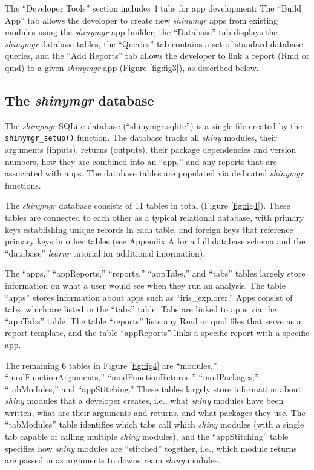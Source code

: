 The ``Developer Tools'' section includes 4 tabs for app development: The ``Build App'' tab allows the developer to create new \emph{shinymgr} apps from existing modules using the \emph{shinymgr} app builder; the ``Database'' tab displays the \emph{shinymgr} database tables, the ``Queries'' tab contains a set of standard database queries, and the ``Add Reports'' tab allows the developer to link a report (Rmd or qmd) to a given \emph{shinymgr} app (Figure \ref{fig:fig3}), as described below.

\subsection{\texorpdfstring{The \emph{shinymgr} database}{The shinymgr database}}\label{the-shinymgr-database}

The \emph{shinymgr} SQLite database (``shinymgr.sqlite'') is a single file created by the \texttt{shinymgr\_setup()} function. The database tracks all \emph{shiny} modules, their arguments (inputs), returns (outputs), their package dependencies and version numbers, how they are combined into an ``app,'' and any reports that are associated with apps. The database tables are populated via dedicated \emph{shinymgr} functions.

The \emph{shinymgr} database consists of 11 tables in total (Figure \ref{fig:fig4}). These tables are connected to each other as a typical relational database, with primary keys establishing unique records in each table, and foreign keys that reference primary keys in other tables (see Appendix A for a full database schema and the ``database'' \emph{learnr} tutorial for additional information).

The ``apps,'' ``appReports,'' ``reports,'' ``appTabs,'' and ``tabs'' tables largely store information on what a user would see when they run an analysis. The table ``apps'' stores information about apps such as ``iris\_explorer.'' Apps consist of tabs, which are listed in the ``tabs'' table. Tabs are linked to apps via the ``appTabs'' table. The table ``reports'' lists any Rmd or qmd files that serve as a report template, and the table ``appReports'' links a specific report with a specific app.

The remaining 6 tables in Figure \ref{fig:fig4} are ``modules,'' ``modFunctionArguments,'' ``modFunctionReturns,'' ``modPackages,'' ``tabModules,'' and ``appStitching.'' These tables largely store information about \emph{shiny} modules that a developer creates, i.e., what \emph{shiny} modules have been written, what are their arguments and returns, and what packages they use. The ``tabModules'' table identifies which tabs call which \emph{shiny} modules (with a single tab capable of calling multiple \emph{shiny} modules), and the ``appStitching'' table specifies how \emph{shiny} modules are ``stitched'' together, i.e., which module returns are passed in as arguments to downstream \emph{shiny} modules.

